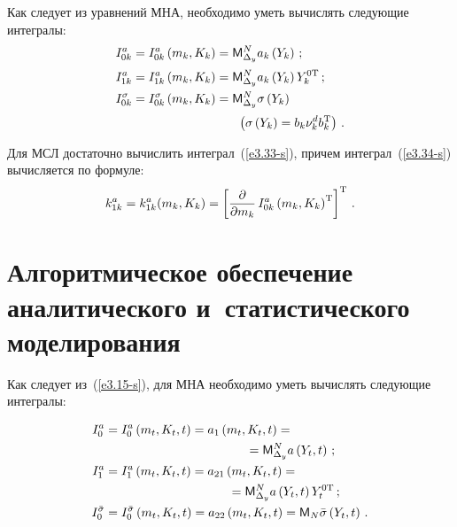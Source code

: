 \begin{multicols}{2}
Как следует из уравнений МНА, необходимо уметь вычислять следующие интегралы:
    \begin{align}
    I_{0k}^a &= I_{0k}^a\left (m_k, K_k\right) = {\sf M}_{\Delta_y}^N a_k \left(Y_k\right)\,;\label{e3.33-s}\\[2pt]
   I_{1k}^a &= I_{1k}^a \left(m_k, K_k\right) = {\sf M}_{\Delta_y}^N a_k \left(Y_k\right) Y_k^{0\mathrm{T}}\,;\label{e3.34-s}
\\
   I_{0k}^\si &= I_{0k}^\si \left(m_k, K_k\right) ={\sf M}_{\Delta_y}^N \si \left(Y_k\right)\notag\\[2pt]
   &\hspace*{30mm}\left(\si \left(Y_k\right) = b_k \nu_k^d b_k^{\mathrm{T}}\right)\,.\notag %
   \end{align}

Для МСЛ достаточно вычислить интеграл~(\ref{e3.33-s}), причем интеграл~(\ref{e3.34-s}) вычисляется по формуле:
    \begin{equation*}
    k_{1k}^a = k_{1k}^a (m_k, K_k) =\left[ \fr{\prt}{\prt m_k}\, I_{0k}^a \left(m_k, K_k\right)^{\mathrm{T}}\right]^{\mathrm{T}}\,. %
    \end{equation*}

  \section{Алгоритмическое обеспечение аналитического и~статистического моделирования}

  \vspace*{-2pt}

Как следует из~(\ref{e3.15-s}), для МНА необходимо уметь вычислять следующие интегралы:

\noindent
    \begin{align}
    I_0^a &= I_0^a \left(m_t, K_t, t\right) = a_1 \left(m_t, K_t, t\right)={}\notag\\
    &\hspace*{40mm}{}={\sf M}_{\Delta_y}^N a\left(Y_t, t\right)\,; \label{e4.1-s}
\\
   I_1^a &= I_1^a \left(m_t, K_t, t\right)= a_{21}\left(m_t, K_t, t\right)= {}\notag\\
&  \hspace*{35mm}{}=  {\sf M}_{\Delta_y}^N a\left(Y_t , t\right) Y_t^{0\mathrm{T}}\,;\notag %
   \\
    I_0^{\bar \si} &= I_0^{\bar \si} \left(m_t, K_t, t\right) = a_{22}\left(m_t, K_t, t\right) ={\sf M}_N \bar \si \left(Y_t, t\right)\,.\notag %
    \end{align}


\end{multicols}
